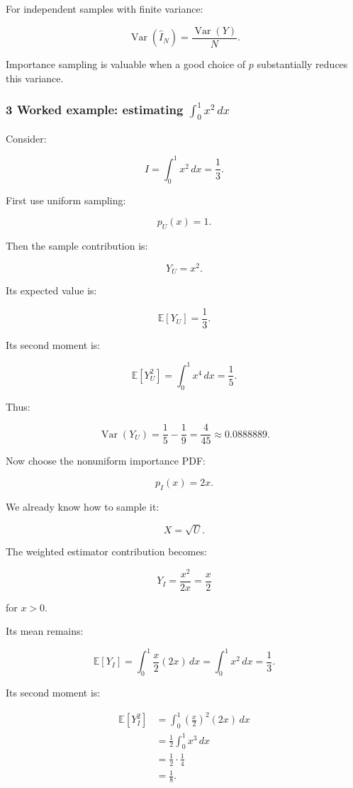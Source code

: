 For independent samples with finite variance:

\[
 \boxed{ \operatorname{Var}(\widehat I_N) = \frac{\operatorname{Var}(Y)}{N} }.
\]

Importance sampling is valuable when a good choice of \(p\) substantially reduces this variance.

\subsubsection{\texorpdfstring{3 Worked example: estimating \(\int_0^1x^2\,dx\)}{3 Worked example: estimating \textbackslash int\_0\^{}1x\^{}2\textbackslash,dx}}\label{02-foundations-ii-ch029-worked-example-estimating-int_01x2dx}

Consider:

\[
 I=\int_0^1x^2\,dx=\boxed{\frac13}.
\]

First use uniform sampling:

\[
 p_U(x)=1.
\]

Then the sample contribution is:

\[
 Y_U=x^2.
\]

Its expected value is:

\[
 \mathbb E[Y_U]=\frac13.
\]

Its second moment is:

\[
 \mathbb E[Y_U^2] = \int_0^1x^4\,dx =\frac15.
\]

Thus:

\[
 \operatorname{Var}(Y_U) = \frac15-\frac19 = \boxed{\frac4{45}} \approx0.0888889.
\]

Now choose the nonuniform importance PDF:

\[
 p_I(x)=2x.
\]

We already know how to sample it:

\[
 X=\sqrt U.
\]

The weighted estimator contribution becomes:

\[
 Y_I= \frac{x^2}{2x} =\frac x2
\]

for \(x>0\).

Its mean remains:

\[
 \mathbb E[Y_I] = \int_0^1\frac x2(2x)\,dx = \int_0^1x^2\,dx =\frac13.
\]

Its second moment is:

\[
 \begin{aligned} \mathbb E[Y_I^2] &= \int_0^1\left(\frac x2\right)^2(2x)\,dx\\ &= \frac12\int_0^1x^3\,dx\\ &=\frac12\cdot\frac14\\ &=\frac18. \end{aligned}
\]

